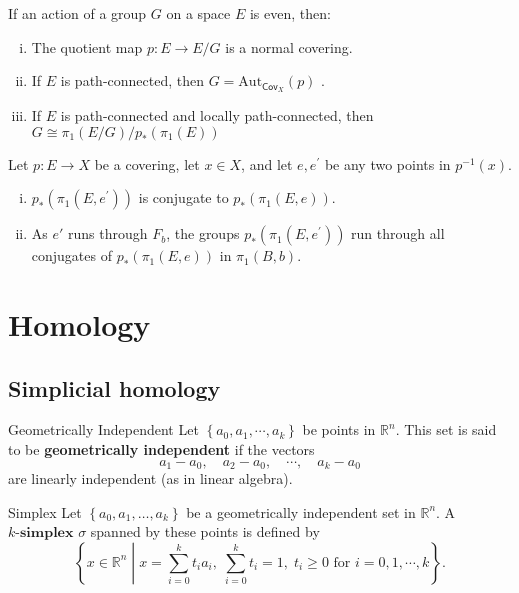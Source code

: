 \documentclass{report}
\begin{document}
\begin{proposition}{}{}
	If an action of a group $G$ on a space $E$ is even, then:
	\begin{enumerate}[(i)]
		\item The quotient map $p: E \rightarrow E / G$ is a normal covering.
		\item If $E$ is path-connected, then $G=\mathrm{Aut}_{\mathsf{Cov}_X}(p)$ .
		\item If $E$ is path-connected and locally path-connected, then $G\cong\pi_1(E / G) / p_*\left(\pi_1(E)\right)$ 
	\end{enumerate}
\end{proposition}



\begin{proposition}{}{}
	Let $p: E \to X$ be a covering, let $x \in X$, and let $e, e^{\prime}$ be any two points in $p^{-1}(x)$.
	\begin{enumerate}[(i)]
		\item $p_*\left(\pi_1\left(E, e^{\prime}\right)\right)$ is conjugate to $p_*\left(\pi_1(E, e)\right)$.
		\item As $e'$ runs through $F_b$, the groups $p_*\left(\pi_1\left(E, e^{\prime}\right)\right)$ run through all conjugates of $p_*\left(\pi_1(E, e)\right)$ in $\pi_1(B, b)$.
	\end{enumerate}
\end{proposition}

\begin{prf}
	
\end{prf}

\chapter{Homology}
\section{Simplicial homology}

\begin{definition}{Geometrically Independent}{}
	Let $\left\{a_0, a_1, \cdots, a_k\right\}$ be points in $\mathbb{R}^n$. This set is said to be \textbf{geometrically independent} if the vectors
$$
a_1-a_0, \quad a_2-a_0, \quad \cdots, \quad a_k-a_0
$$
are linearly independent (as in linear algebra).
\end{definition}


\begin{definition}{Simplex}{}
Let $\left\{a_0, a_1, \ldots, a_k\right\}$ be a geometrically independent set in $\mathbb{R}^n$. A $\textbf{$k$-simplex } \sigma$ spanned by these points is defined by
$$
\left\{x\in \mathbb{R}^n\;\left|\; x=\sum_{i=0}^k t_i a_i,\;\sum_{i=0}^k t_i=1,\;t_i \geq 0\text{ for }i = 0,1,\cdots, k\right.\right\}.
$$
\end{definition}
\end{document}
